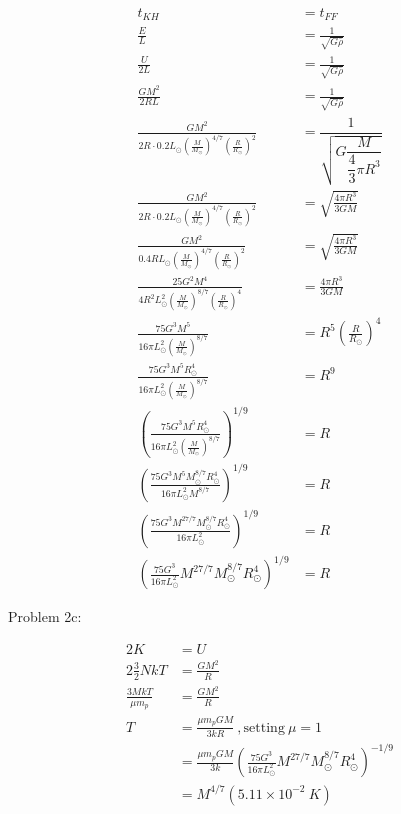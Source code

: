\documentclass[10pt,a4paper,final]{article}
\begin{document}
\begin{align}
t_{KH} & = t_{FF}\\
\frac{E}{L} & = \frac{1}{\sqrt{G \bar{\rho}}}\\
\frac{U}{2L} & = \frac{1}{\sqrt{G \bar{\rho}}}\\
\frac{GM^2}{2RL} & = \frac{1}{\sqrt{G \bar{\rho}}}\\
\frac{GM^2}{2R \cdot 0.2L_\odot \left( \frac{M}{M_\odot} \right)^{4/7} \left( \frac{R}{R_\odot}\right)^2} & = \dfrac{1}{\sqrt{G\dfrac{M}{\dfrac{4}{3} \pi R^3}}}\\
\frac{GM^2}{2R \cdot 0.2L_\odot \left( \frac{M}{M_\odot} \right)^{4/7} \left( \frac{R}{R_\odot}\right)^2} & = \sqrt{\frac{4\pi R^3}{3GM}}\\
\frac{GM^2}{0.4RL_\odot \left( \frac{M}{M_\odot} \right) ^{4/7} \left( \frac{R}{R_\odot} \right)^2} & = \sqrt{\frac{4\pi R^3}{3GM}}\\
\frac{25G^2M^4}{4R^2L_\odot^2 \left( \frac{M}{M_\odot} \right)^{8/7} \left( \frac{R}{R_\odot} \right)^4} & = \frac{4 \pi R^3}{3GM}\\
\frac{75 G^3 M^5}{16 \pi L_\odot^2 \left( \frac{M}{M_\odot} \right)^{8/7}} & = R^5 \left( \frac{R}{R_\odot} \right)^4\\
\frac{75G^3M^5R_\odot^4}{16 \pi L_\odot^2 \left( \frac{M}{M_\odot} \right)^{8/7}} & = R^9\\
\left( \frac{75G^3M^5R_\odot^4}{16 \pi L_\odot^2 \left( \frac{M}{M_\odot} \right)^{8/7}} \right)^{1/9} & = R\\
\left( \frac{75G^3M^5 M_\odot^{8/7}R_\odot^4}{16 \pi L_\odot^2 M^{8/7}} \right)^{1/9} & = R\\
\left( \frac{75G^3M^{27/7} M_\odot^{8/7}R_\odot^4}{16 \pi L_\odot^2} \right)^{1/9} & = R\\
\left( \frac{75G^3}{16 \pi L_\odot^2}  M^{27/7} M_\odot^{8/7} R_\odot^4 \right)^{1/9} & = R
\end{align}

Problem 2c:

\begin{align}
2K &  = U\\
2 \frac{3}{2}NkT & = \frac{GM^2}{R}\\
\frac{3MkT}{\mu m_p} & = \frac{GM^2}{R}\\
T & = \frac{\mu m_p GM}{3kR}~, \text{setting} ~\mu = 1\\
& = \frac{\mu m_p GM}{3k} \left( \frac{75G^3}{16 \pi L_\odot^2}  M^{27/7} M_\odot^{8/7} R_\odot^4 \right)^{-1/9}\\
& = M^{4/7} (5.11 \times 10^{-2} ~K)
\end{align}
\end{document}
